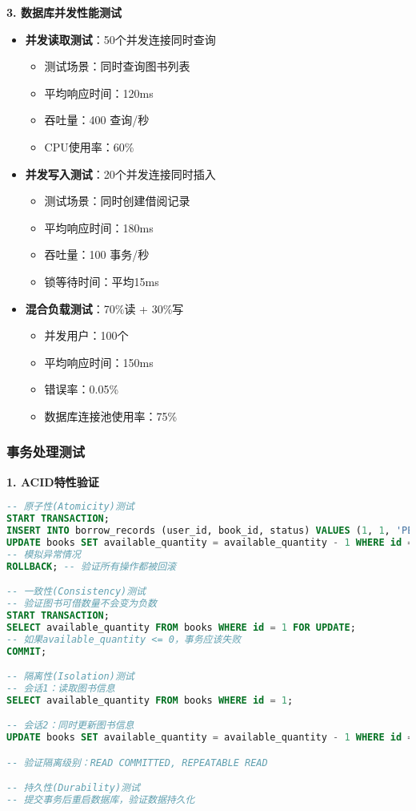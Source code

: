 \documentclass[12pt,a4paper]{article}
\begin{document}
\textbf{3. 数据库并发性能测试}
\begin{itemize}
    \item \textbf{并发读取测试}：50个并发连接同时查询
    \begin{itemize}
        \item 测试场景：同时查询图书列表
        \item 平均响应时间：120ms
        \item 吞吐量：400 查询/秒
        \item CPU使用率：60\%
    \end{itemize}
    
    \item \textbf{并发写入测试}：20个并发连接同时插入
    \begin{itemize}
        \item 测试场景：同时创建借阅记录
        \item 平均响应时间：180ms  
        \item 吞吐量：100 事务/秒
        \item 锁等待时间：平均15ms
    \end{itemize}
    
    \item \textbf{混合负载测试}：70\%读 + 30\%写
    \begin{itemize}
        \item 并发用户：100个
        \item 平均响应时间：150ms
        \item 错误率：0.05\%
        \item 数据库连接池使用率：75\%
    \end{itemize}
\end{itemize}

\subsubsection{事务处理测试}

\textbf{1. ACID特性验证}
\begin{lstlisting}[language=sql]
-- 原子性(Atomicity)测试
START TRANSACTION;
INSERT INTO borrow_records (user_id, book_id, status) VALUES (1, 1, 'PENDING');
UPDATE books SET available_quantity = available_quantity - 1 WHERE id = 1;
-- 模拟异常情况
ROLLBACK; -- 验证所有操作都被回滚

-- 一致性(Consistency)测试  
-- 验证图书可借数量不会变为负数
START TRANSACTION;
SELECT available_quantity FROM books WHERE id = 1 FOR UPDATE;
-- 如果available_quantity <= 0，事务应该失败
COMMIT;

-- 隔离性(Isolation)测试
-- 会话1：读取图书信息
SELECT available_quantity FROM books WHERE id = 1;

-- 会话2：同时更新图书信息
UPDATE books SET available_quantity = available_quantity - 1 WHERE id = 1;

-- 验证隔离级别：READ COMMITTED, REPEATABLE READ

-- 持久性(Durability)测试
-- 提交事务后重启数据库，验证数据持久化
\end{lstlisting}
\end{document}
